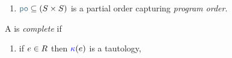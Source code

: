 \begin{definition}
\begin{enumerate}[,label=(\textsc{m}\arabic*),ref=\textsc{m}\arabic*]
\begin{multicols}{2}
\begin{enumerate}
    \item \label{pom-m-kappa} 
      if $\aEv\in\dmEvs$ then 
    \end{enumerate}
    \end{multicols}

  \item \label{pom-po} 
    ${\rpox} \subseteq (\umEvs\times\umEvs)$ is a partial order capturing
    \emph{program order}.
  \end{enumerate}


  A \PwTpo{} is \emph{complete} if 
  \begin{multicols}{2}
    \begin{enumerate}[,label=(\textsc{c}\arabic*),ref=\textsc{c}\arabic*]

      \setcounter{enumi}{\value{Bkappa}}
    \item \label{top-kappa-c11}
      if $e\in R$ then ${\color{blue}\kappa}(e)$ is a tautology,



\end{enumerate}
\end{multicols}
\end{definition}
